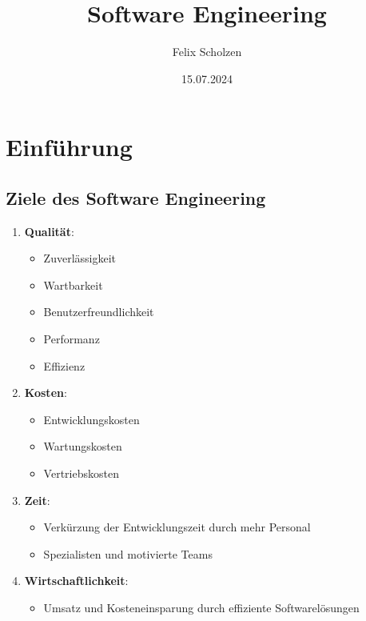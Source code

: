 \documentclass[11pt, a4paper]{article}
\title{Software Engineering}
\author{Felix Scholzen}
\date{15.07.2024}
\begin{document}
\maketitle

\tableofcontents
\newpage




\section{Einführung} %

\subsection{Ziele des Software Engineering}

\begin{enumerate}
    \item \textbf{Qualität}:
    \begin{itemize}
        \item Zuverlässigkeit
        \item Wartbarkeit
        \item Benutzerfreundlichkeit
        \item Performanz
        \item Effizienz
    \end{itemize}

    \item \textbf{Kosten}:
    \begin{itemize}
        \item Entwicklungskosten
        \item Wartungskosten
        \item Vertriebskosten
    \end{itemize}

    \item \textbf{Zeit}:
    \begin{itemize}
        \item Verkürzung der Entwicklungszeit durch mehr Personal
        \item Spezialisten und motivierte Teams
    \end{itemize}

    \item \textbf{Wirtschaftlichkeit}:
    \begin{itemize}
        \item Umsatz und Kosteneinsparung durch effiziente Softwarelösungen
    \end{itemize}
\end{enumerate}
\end{document}
